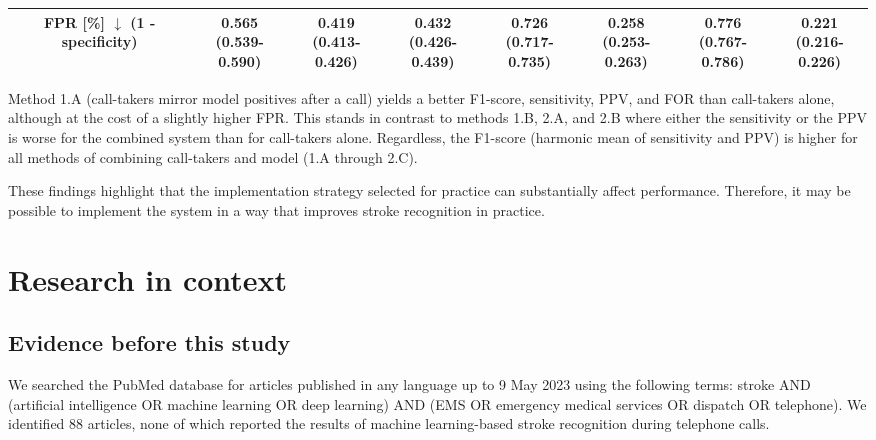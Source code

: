 {\begin{sidewaystable}
{\begin{tabular}{c|c|cc|cc|cc}
        \midrule
        \makecell[l]{FPR [\%] $\downarrow$ \\ (1 - specificity)} & \makecell[c]{0.565 \\ (0.539-0.590)} & \makecell[c]{0.419 \\ (0.413-0.426)} & \makecell[c]{0.432 \\ (0.426-0.439)} & \makecell[c]{0.726 \\ (0.717-0.735)} & \makecell[c]{0.258 \\ (0.253-0.263)} & \makecell[c]{0.776 \\ (0.767-0.786)} & \makecell[c]{0.221 \\ (0.216-0.226)} \\

        \bottomrule
    \end{tabular}%
    }
\end{sidewaystable}

Method 1.A (call-takers mirror model positives after a call) yields a better F1-score, sensitivity, PPV, and FOR than call-takers alone, although at the cost of a slightly higher FPR. This stands in contrast to methods 1.B, 2.A, and 2.B where either the sensitivity or the PPV is worse for the combined system than for call-takers alone. Regardless, the F1-score (harmonic mean of sensitivity and PPV) is higher for all methods of combining call-takers and model (1.A through 2.C).

These findings highlight that the implementation strategy selected for practice can substantially affect performance. Therefore, it may be possible to implement the system in a way that improves stroke recognition in practice.


\section{Research in context}

\subsection{Evidence before this study}

We searched the PubMed database for articles published in any language up to 9 May 2023 using the following terms: stroke AND (artificial intelligence OR machine learning OR deep learning) AND (EMS OR emergency medical services OR dispatch OR telephone). We identified 88 articles, none of which reported the results of machine learning-based stroke recognition during telephone calls.

}
